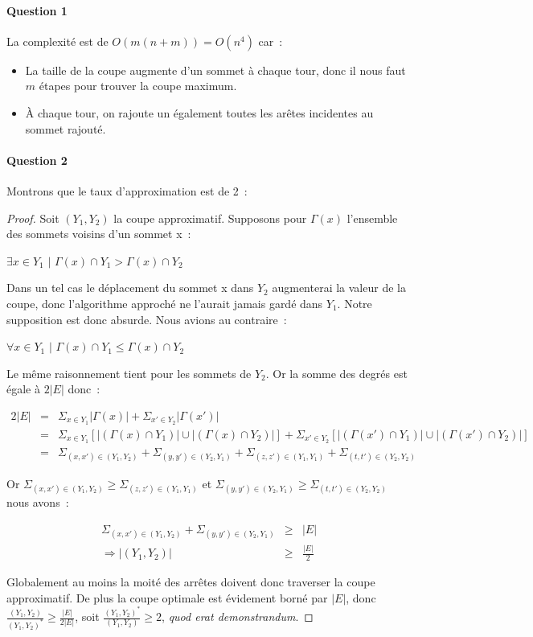 \paragraph{Question 1}
La complexité est de $O(m(n+m))=O(n^4)$ car~:
\begin{itemize}
\item La taille de la coupe augmente d'un sommet à chaque tour, donc
il nous faut $m$ étapes pour trouver la coupe maximum.
\item À chaque tour, on rajoute un également toutes les arêtes
incidentes au sommet rajouté.
\end{itemize}

\paragraph{Question 2}
Montrons que le taux d'approximation est de 2~:
\begin{proof}Soit $(Y_1,Y_2)$ la coupe approximatif. Supposons pour $\Gamma(x)$ l'ensemble des sommets voisins d'un sommet x~:

$\exists x \in Y_1 \text{ | } \Gamma(x) \cap Y_1 > \Gamma(x) \cap Y_2$

Dans un tel cas le déplacement du sommet x dans $Y_2$ augmenterai la valeur de la coupe, donc l'algorithme approché ne l'aurait jamais gardé dans $Y_1$. Notre supposition est donc absurde. Nous avions au contraire~:

$\forall x \in Y_1 \text{ | } \Gamma(x) \cap Y_1 \leq \Gamma(x) \cap Y_2$

Le même raisonnement tient pour les sommets de $Y_2$. Or la somme des degrés est égale à $2|E|$ donc~:

\begin{eqnarray*}
2|E| &=& \Sigma_{x \in Y_1}|\Gamma(x)|  + \Sigma_{x' \in Y_2}|\Gamma(x')| \\
	 &=& \Sigma_{x \in Y_1}[|(\Gamma(x)\cap{} Y_1)|\cup|(\Gamma(x)\cap{}Y_2)|] +
	 	 \Sigma_{x' \in Y_2}[|(\Gamma(x')\cap{} Y_1)|\cup|(\Gamma(x')\cap{}Y_2)|] \\
	 &=& \Sigma_{(x,x') \in (Y_1,Y_2)} +
	 	 \Sigma_{(y,y') \in (Y_2,Y_1)} + 
	 	 \Sigma_{(z,z') \in (Y_1,Y_1)} +
	 	 \Sigma_{(t,t') \in (Y_2,Y_2)} 
\end{eqnarray*}

Or $\Sigma_{(x,x') \in (Y_1,Y_2)} \geq \Sigma_{(z,z') \in (Y_1,Y_1)}$ et $\Sigma_{(y,y') \in (Y_2,Y_1)} \geq \Sigma_{(t,t') \in (Y_2,Y_2)}$ nous avons~:

\begin{eqnarray*}
\Sigma_{(x,x') \in (Y_1,Y_2)} + \Sigma_{(y,y') \in (Y_2,Y_1)} &\geq& |E| \\
\Rightarrow |(Y_1, Y_2)| &\geq& \frac{|E|}{2}
\end{eqnarray*}

Globalement au moins la moité des arrêtes doivent donc traverser la coupe approximatif. De plus la coupe optimale est évidement borné par $|E|$, donc $\frac{(Y_1,Y_2)}{(Y_1,Y_2)^*} \geq \frac{|E|}{2|E|}$, soit $\frac{(Y_1,Y_2)^*}{(Y_1,Y_2)} \geq 2$, \emph{quod erat demonstrandum}.
\end{proof}

